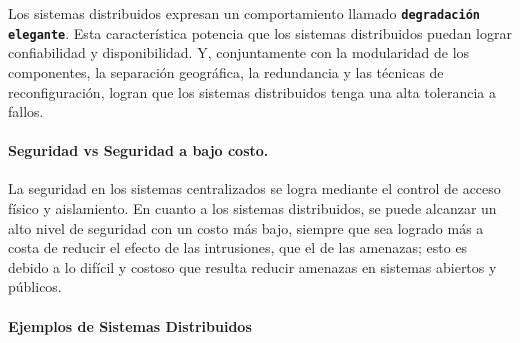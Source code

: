 

Los sistemas distribuidos expresan un comportamiento llamado  \texttt{\textbf{degradación elegante}}. Esta característica  potencia que los sistemas distribuidos puedan  lograr confiabilidad y disponibilidad. Y, conjuntamente con la modularidad de los componentes, la separación geográfica,  la redundancia y las técnicas de reconfiguración, logran que los sistemas distribuidos tenga una alta tolerancia a fallos.   

\paragraph{Seguridad vs Seguridad a bajo costo.}
La  seguridad en los sistemas centralizados  se logra mediante el control de acceso físico y aislamiento.
En cuanto a los sistemas distribuidos, se  puede alcanzar un alto nivel de seguridad con un costo más bajo,  siempre que sea logrado más a costa de reducir el efecto de las intrusiones, que el de las amenazas; esto es debido a lo difícil y costoso que resulta reducir amenazas en sistemas abiertos y públicos. 

\paragraph{Ejemplos de Sistemas Distribuidos} 

